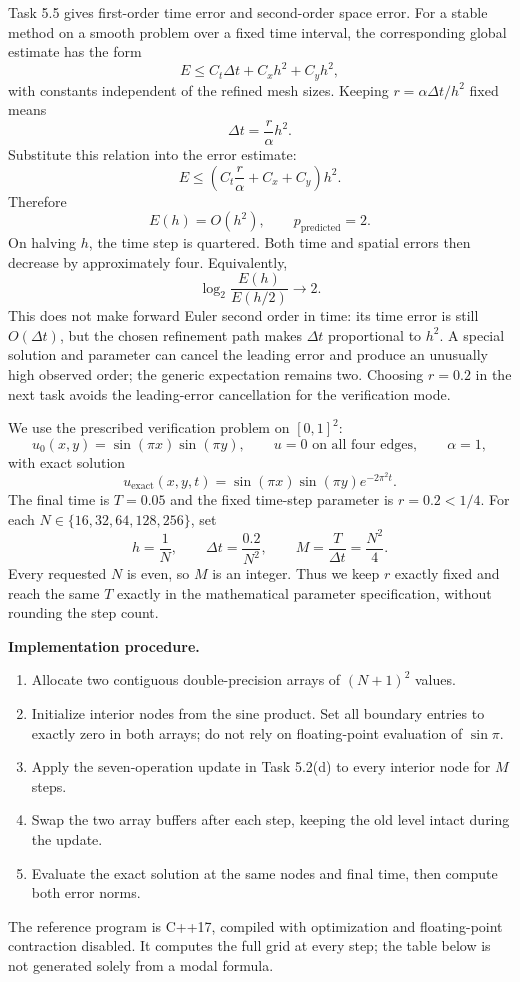 Task 5.5 gives first-order time error and second-order space error. For a stable method on a
smooth problem over a fixed time interval, the corresponding global estimate has the form
\[
E\le C_t\Delta t+C_xh^2+C_yh^2,
\]
with constants independent of the refined mesh sizes. Keeping
$r=\alpha\Delta t/h^2$ fixed means
\[
\Delta t=\frac{r}{\alpha}h^2.
\]
Substitute this relation into the error estimate:
\[
E\le\left(C_t\frac r\alpha+C_x+C_y\right)h^2.
\]
Therefore
\[
\boxed{E(h)=O(h^2),\qquad p_{\mathrm{predicted}}=2.}
\]
On halving $h$, the time step is quartered. Both time and spatial errors then decrease by
approximately four. Equivalently,
\[
\log_2\frac{E(h)}{E(h/2)}\longrightarrow2.
\]
This does not make forward Euler second order in time: its time error is still $O(\Delta t)$,
but the chosen refinement path makes $\Delta t$ proportional to $h^2$.
A special solution and parameter can cancel the leading error and produce an unusually high
observed order; the generic expectation remains two. Choosing $r=0.2$ in the next task avoids
the leading-error cancellation for the verification mode.

We use the prescribed verification problem on $[0,1]^2$:
\[
u_0(x,y)=\sin(\pi x)\sin(\pi y),\qquad u=0\text{ on all four edges},\qquad\alpha=1,
\]
with exact solution
\[
u_{\mathrm{exact}}(x,y,t)=\sin(\pi x)\sin(\pi y)e^{-2\pi^2t}.
\]
The final time is $T=0.05$ and the fixed time-step parameter is $r=0.2<1/4$.
For each $N\in\{16,32,64,128,256\}$, set
\[
h=\frac1N,\qquad \Delta t=\frac{0.2}{N^2},\qquad
M=\frac{T}{\Delta t}=\frac{N^2}{4}.
\]
Every requested $N$ is even, so $M$ is an integer. Thus we keep $r$ exactly fixed and reach
the same $T$ exactly in the mathematical parameter specification, without rounding the step count.

\textbf{Implementation procedure.}
\begin{enumerate}
\item Allocate two contiguous double-precision arrays of $(N+1)^2$ values.
\item Initialize interior nodes from the sine product. Set all boundary entries to exactly zero
in both arrays; do not rely on floating-point evaluation of $\sin\pi$.
\item Apply the seven-operation update in Task 5.2(d) to every interior node for $M$ steps.
\item Swap the two array buffers after each step, keeping the old level intact during the update.
\item Evaluate the exact solution at the same nodes and final time, then compute both error norms.
\end{enumerate}
The reference program is C++17, compiled with optimization and floating-point contraction disabled.
It computes the full grid at every step; the table below is not generated solely from a modal formula.

